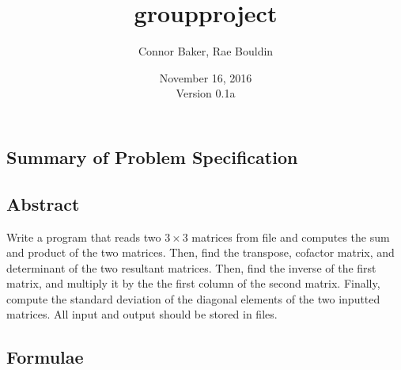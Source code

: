 \documentclass[12pt]{article}
\begin{document}
\null
\nointerlineskip 
\vfill
\let \snewpage \newpage
\let \newpage \relax
    \title{groupproject}
    \author{Connor Baker, Rae Bouldin}
    \date{November 16, 2016\\Version 0.1a}
\maketitle
\let \newpage \snewpage
\vfill
\thispagestyle{empty}



\newpage %



\makeatletter
{}
\makeatother
\tableofcontents

\clearpage
{}

\begin{center}
\section{Summary of Problem Specification}
\end{center}
\subsection{Abstract}
Write a program that reads two $3\times3$ matrices from file and computes the sum and product of the two matrices. Then, find the transpose, cofactor matrix, and determinant of the two resultant matrices. Then, find the inverse of the first matrix, and multiply it by the the first column of the second matrix. Finally, compute the standard deviation of the diagonal elements of the two inputted matrices.
All input and output should be stored in files.



\newpage %



\begin{center}
\section{Formulae}
\end{center}
\end{document}
